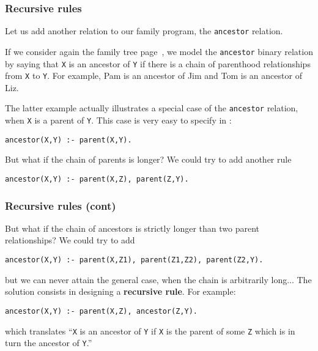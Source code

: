 
%
\begin{frame}[containsverbatim]
\frametitle{Recursive rules}

Let us add another relation to our family program, the
\texttt{ancestor} relation. 

\bigskip

If we consider again the family tree page~\pageref{family_tree}, we
model the \texttt{ancestor} binary relation by saying that \texttt{X}
is an ancestor of \texttt{Y} if there is a chain of parenthood
relationships from \texttt{X} to \texttt{Y}. For example, Pam is an
ancestor of Jim and Tom is an ancestor of Liz.

\bigskip

The latter example actually illustrates a special case of the
\texttt{ancestor} relation, when \texttt{X} is a parent of
\texttt{Y}. This case is very easy to specify in \Prolog:
{\small
\begin{verbatim}
ancestor(X,Y) :- parent(X,Y).
\end{verbatim}
}
But what if the chain of parents is longer? We could try to add
another rule
{\small
\begin{verbatim}
ancestor(X,Y) :- parent(X,Z), parent(Z,Y).
\end{verbatim}
}

\end{frame}

%
\begin{frame}[containsverbatim]
\frametitle{Recursive rules (cont)}

But what if the chain of ancestors is strictly longer than two
parent relationships? We could try to add
{\small
\begin{verbatim}
ancestor(X,Y) :- parent(X,Z1), parent(Z1,Z2), parent(Z2,Y).
\end{verbatim}
}
but we can never attain the general case, when the chain is
arbitrarily long... The solution consists in designing a
\textbf{recursive rule}. For example:
{\small
\begin{verbatim}
ancestor(X,Y) :- parent(X,Z), ancestor(Z,Y).
\end{verbatim}
}
which translates ``\texttt{X} is an ancestor of \texttt{Y} if
\texttt{X} is the parent of some \texttt{Z} which is in turn the
ancestor of \texttt{Y}.''

\end{frame}

